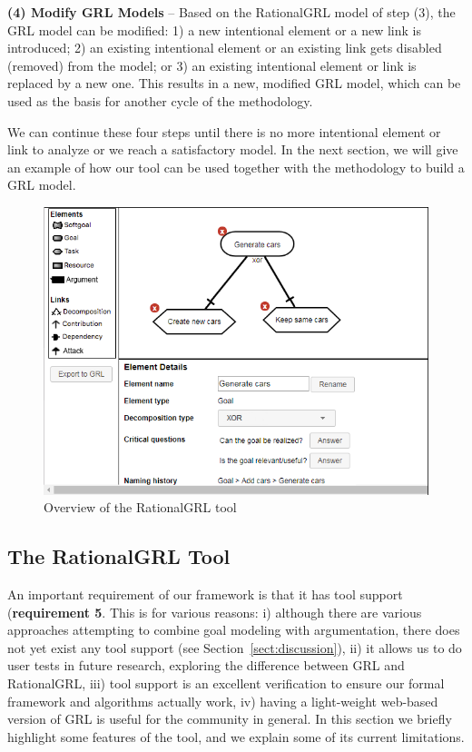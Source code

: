 \textbf{(4) Modify GRL Models} -- Based on the RationalGRL model of step (3), the GRL model can be modified: 1) a new intentional element or a new link is introduced; 2) an existing intentional element or an existing link gets disabled (removed) from the model; or 3) an existing intentional element or link is replaced by a new one. This results in a new, modified GRL model, which can be used as the basis for another cycle of the methodology. 

We can continue these four steps until there is no more intentional element or link to analyze or we reach a satisfactory model. In the next section, we will give an example of how our tool can be used together with the methodology to build a GRL model.  

\begin{figure}[t]
\centering
\includegraphics[scale=0.8]{img/tool/goal_details}
\caption{Overview of the RationalGRL tool}
\label{fig:tool:overview}
\end{figure}


\subsection{The RationalGRL Tool}
\label{sect:tool}

An important requirement of our framework is that it has tool support (\textbf{requirement 5}. This is for various reasons: i) although there are various approaches attempting to combine goal modeling with argumentation, there does not yet exist any tool support (see Section~\ref{sect:discussion}), ii) it allows us to do user tests in future research, exploring the difference between GRL and RationalGRL, iii) tool support is an excellent verification to ensure our formal framework and algorithms actually work, iv) having a light-weight web-based version of GRL is useful for the community in general. In this section we briefly highlight some features of the tool, and we explain some of its current limitations.


